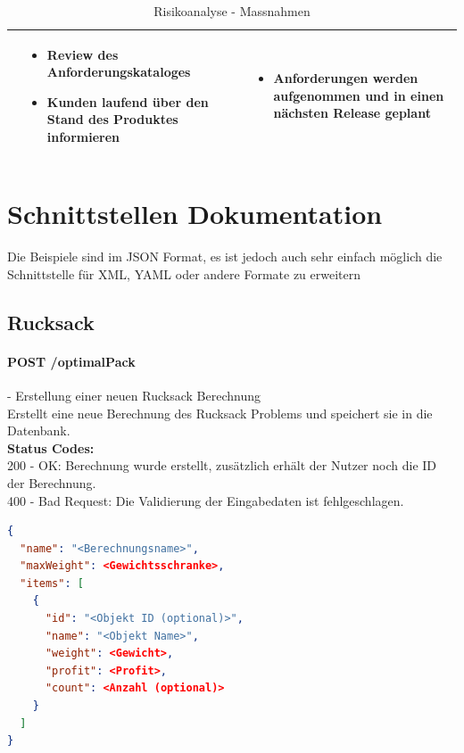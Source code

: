 \begin{table}[ht]
\begin{tabular}{  l | p{4cm} | p{4cm} }
								&	\begin{itemize}
										\item Review des Anforderungskataloges
										\item Kunden laufend über den Stand des Produktes informieren
									\end{itemize}
								&	\begin{itemize}
										\item Anforderungen werden aufgenommen und in einen nächsten Release geplant							
									\end{itemize}	\\ \hline			
  \end{tabular}
   \caption{Risikoanalyse - Massnahmen}
\end{table}

\section{Schnittstellen Dokumentation}\label{api_doc}

Die Beispiele sind im JSON Format, es ist jedoch auch sehr einfach möglich die Schnittstelle für XML, YAML oder andere Formate zu erweitern

%
%
%
%

\subsection{Rucksack}

\paragraph{POST /optimalPack} - Erstellung einer neuen Rucksack Berechnung\mbox{}\\
Erstellt eine neue Berechnung des Rucksack Problems und speichert sie in die Datenbank.\\
\textbf{Status Codes:}\\
200 - OK: Berechnung wurde erstellt, zusätzlich erhält der Nutzer noch die ID der Berechnung.\\
400 - Bad Request: Die Validierung der Eingabedaten ist fehlgeschlagen.\\

\begin{lstlisting}[language=JSON, caption=Beispiel einer Eingabe für das Rucksack Problem, label=lst:input_knapsack]  
{
  "name": "<Berechnungsname>",
  "maxWeight": <Gewichtsschranke>,
  "items": [
    {
      "id": "<Objekt ID (optional)>",
      "name": "<Objekt Name>",
      "weight": <Gewicht>,
      "profit": <Profit>,
      "count": <Anzahl (optional)>
    }
  ]
}
\end{lstlisting}

